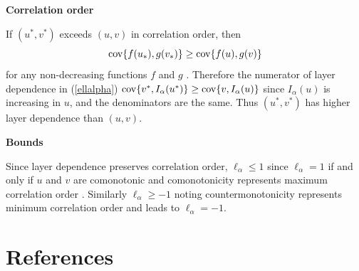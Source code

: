 \documentclass[authoryear]{elsarticle}
\newcommand{\cov}{{\rm cov}}
\newcommand{\eref}[1]{(\ref{#1})}
\begin{document}
\textbf{Correlation order}


If $(u^*,v^*)$ exceeds $(u,v)$ in correlation order, then
$$
\cov\{f(u_*),g(v_*)\} \geq \cov\{f(u),g(v)\}
$$
for any non-decreasing functions $f$ and $g$ \citep{dhaene2009correlation}. Therefore the numerator of layer dependence in \eref{ellalpha} $\cov\{v^*,I_\alpha(u^*)\} \geq \cov\{v,I_\alpha(u)\}$ since $I_\alpha(u)$ is increasing in $u$, and the denominators are the same. Thus $(u^*,v^*)$ has higher layer dependence than $(u,v)$.




\textbf{Bounds}

Since layer dependence preserves correlation order, $\ell_\alpha\le 1$ since $\ell_\alpha=1$ if and only if $u$ and $v$ are comonotonic and comonotonicity represents maximum correlation order \citep{dhaene2009correlation}. Similarly $\ell_\alpha \ge -1$ noting countermonotonicity represents minimum correlation order and leads to $\ell_\alpha=-1$.

\newpage


\section*{References}


\end{document}
